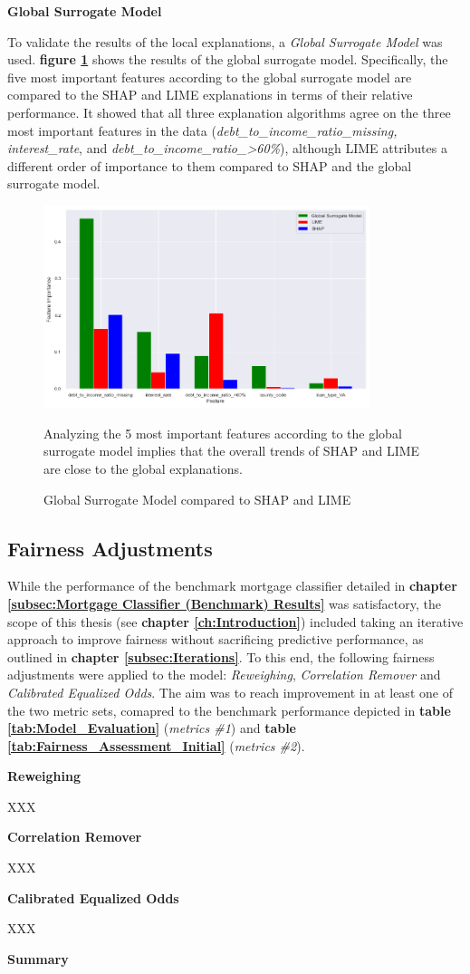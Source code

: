 \textbf{Global Surrogate Model}

To validate the results of the local explanations, a \textit{Global Surrogate Model} was used. \textbf{figure \ref{fig:Global_Surrogate}} shows the results of the global surrogate model. Specifically, the five most important features according to the global surrogate model are compared to the SHAP and LIME explanations in terms of their relative performance.
It showed that all three explanation algorithms agree on the three most important features in the data (\textit{debt\_to\_income\_ratio\_missing, interest\_rate}, and \textit{debt\_to\_income\_ratio\_>60\%}), although LIME attributes a different order of importance to them compared to SHAP and the global surrogate model.

\begin{figure}[h]
    \centering
    \includegraphics[width=0.85\textwidth]{images/CHXX_UPDATE_Surrogate_SHAP_LIME_combined.png}
    \caption{Global Surrogate Model compared to SHAP and LIME}
    \medskip
    \small
    Analyzing the 5 most important features according to the global surrogate model implies that the overall trends of SHAP and LIME are close to the global explanations.
    \label{fig:Global_Surrogate}
\end{figure}

\subsection{Fairness Adjustments}\label{Fairness Adjustments Results}

While the performance of the benchmark mortgage classifier detailed in \textbf{chapter \ref{subsec:Mortgage Classifier (Benchmark) Results}} was satisfactory, the scope of this thesis (see \textbf{chapter \ref{ch:Introduction}}) included taking an iterative approach to improve fairness without sacrificing predictive performance, as outlined in \textbf{chapter \ref{subsec:Iterations}}.
To this end, the following fairness adjustments were applied to the model: \textit{Reweighing}, \textit{Correlation Remover} and \textit{Calibrated Equalized Odds}. The aim was to reach improvement in at least one of the two metric sets, comapred to the benchmark performance depicted in \textbf{table \ref{tab:Model_Evaluation}} (\textit{metrics \#1}) and \textbf{table \ref{tab:Fairness_Assessment_Initial}} (\textit{metrics \#2}).

\textbf{Reweighing}

XXX

\textbf{Correlation Remover}

XXX

\textbf{Calibrated Equalized Odds}

XXX

\textbf{Summary}

